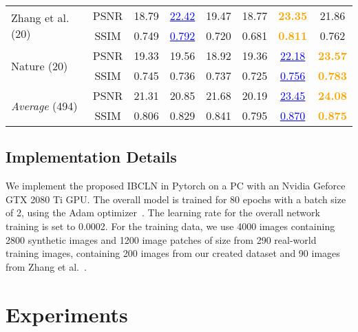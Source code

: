 \documentclass[10pt,twocolumn,letterpaper]{article}
\begin{document}
\begin{table*}[!htbp]
{\begin{tabular}{lccccccc}
                
                
                
                \multirow{2}{*}{Zhang et al. (20)}
                &PSNR&18.79&\textcolor{blue}{\underline{22.42}}&19.47&18.77& \textcolor{orange}{\textbf{23.35}}&21.86\\
                &SSIM&0.749&\textcolor{blue}{\underline{0.792}}&0.720&0.681& \textcolor{orange}{\textbf{0.811}}& 0.762\\
                \hline
                \multirow{2}{*}{Nature (20)}
                &PSNR& 19.33&19.56&18.92&19.36&\textcolor{blue}{\underline{22.18}}& \textcolor{orange}{\textbf{23.57}}  \\
                &SSIM&   0.745 &0.736 &0.737&0.725&\textcolor{blue}{\underline{0.756}}&\textcolor{orange}{\textbf{0.783}}\\
                \hline
                \multirow{2}{*}{\emph{Average} (494)} 
                &PSNR&21.31&20.85&21.68&20.19&\textcolor{blue}{\underline{23.45}}&\textcolor{orange}{\textbf{24.08}}\\
                &SSIM&0.806&0.829&0.841 &0.795&\textcolor{blue}{\underline{0.870}}&\textcolor{orange}{\textbf{0.875}}\\
                \bottomrule
        \end{tabular}}
        \label{tb:method-com}
        \vspace{2pt}
    \end{table*}

\subsection{Implementation Details}
We implement the proposed IBCLN in Pytorch on a PC with an Nvidia Geforce GTX 2080 Ti GPU. The overall model is trained for 80 epochs with a batch size of 2, using the Adam optimizer~\cite{kingma2014adam}. The learning rate for the overall network training is set to 0.0002. For the training data, we use 4000 images containing 2800 synthetic images and 1200 image patches of size  from 290 real-world training images, containing 200 images from our created dataset and 90 images from Zhang et al.~\cite{zhang2018single}.

\section{Experiments}
\end{document}
